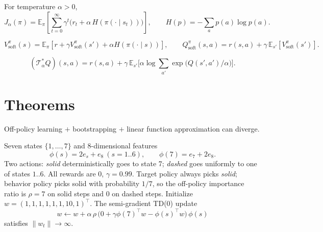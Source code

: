 \begin{definition}
For temperature $\alpha>0$,
\[
J_\alpha(\pi)=\mathbb{E}_\pi\!\left[\sum_{t=0}^{\infty}\gamma^t\big(r_t+\alpha\,H(\pi(\cdot\mid s_t))\big)\right],\qquad H(p)=-\sum_a p(a)\log p(a).
\]
\end{definition}

\begin{definition}
\[
V^\pi_{\mathrm{soft}}(s)=\mathbb{E}_\pi[r+\gamma V^\pi_{\mathrm{soft}}(s')+\alpha H(\pi(\cdot\mid s))],\qquad
Q^\pi_{\mathrm{soft}}(s,a)=r(s,a)+\gamma\,\mathbb{E}_{s'}[V^\pi_{\mathrm{soft}}(s')].
\]
\end{definition}

\begin{definition}
\[
(\mathcal{T}^*_\alpha Q)(s,a)=r(s,a)+\gamma\,\mathbb{E}_{s'}\!\Big[\alpha\log\!\sum_{a'}\exp\!\big(Q(s',a')/\alpha\big)\Big].
\]
\end{definition}

\section*{Theorems}

\begin{theorem}
Off-policy learning $+$ bootstrapping $+$ linear function approximation can diverge.
\end{theorem}

\begin{example}
Seven states $\{1,\ldots,7\}$ and 8-dimensional features
\[
\phi(s)=2e_s+e_8\ (s=1..6),\qquad \phi(7)=e_7+2e_8.
\]
Two actions: \emph{solid} deterministically goes to state 7; \emph{dashed} goes uniformly to one of states $1..6$. All rewards are $0$, $\gamma=0.99$. Target policy always picks \emph{solid}; behavior policy picks solid with probability $1/7$, so the off-policy importance ratio is $\rho=7$ on solid steps and $0$ on dashed steps. Initialize $w=(1,1,1,1,1,1,10,1)^\top$. The semi-gradient TD(0) update
\[
w\leftarrow w+\alpha\,\rho\,\big(0+\gamma\phi(7)^\top w-\phi(s)^\top w\big)\,\phi(s)
\]
satisfies $\|w_t\|\to\infty$.
\end{example}

